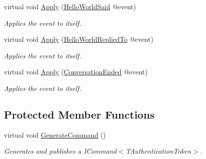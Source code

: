 \begin{DoxyCompactItemize}
virtual void \hyperlink{classCqrs_1_1Akka_1_1Tests_1_1Unit_1_1Sagas_1_1ConversationReportProcessManager_a19573bf2840357a4e79f310c3fdfe916_a19573bf2840357a4e79f310c3fdfe916}{Apply} (\hyperlink{classCqrs_1_1Akka_1_1Tests_1_1Unit_1_1Events_1_1HelloWorldSaid}{Hello\+World\+Said} @event)
\begin{DoxyCompactList}\small\item\em Applies the {\itshape event}  to itself. \end{DoxyCompactList}\item 
virtual void \hyperlink{classCqrs_1_1Akka_1_1Tests_1_1Unit_1_1Sagas_1_1ConversationReportProcessManager_a938040ac51a3deb02ae36adb7f5999fb_a938040ac51a3deb02ae36adb7f5999fb}{Apply} (\hyperlink{classCqrs_1_1Akka_1_1Tests_1_1Unit_1_1Events_1_1HelloWorldRepliedTo}{Hello\+World\+Replied\+To} @event)
\begin{DoxyCompactList}\small\item\em Applies the {\itshape event}  to itself. \end{DoxyCompactList}\item 
virtual void \hyperlink{classCqrs_1_1Akka_1_1Tests_1_1Unit_1_1Sagas_1_1ConversationReportProcessManager_ae2c1edeb1a4d604948b4c70b71c20555_ae2c1edeb1a4d604948b4c70b71c20555}{Apply} (\hyperlink{classCqrs_1_1Akka_1_1Tests_1_1Unit_1_1Events_1_1ConversationEnded}{Conversation\+Ended} @event)
\begin{DoxyCompactList}\small\item\em Applies the {\itshape event}  to itself. \end{DoxyCompactList}\end{DoxyCompactItemize}
\subsection*{Protected Member Functions}
\begin{DoxyCompactItemize}
\item 
virtual void \hyperlink{classCqrs_1_1Akka_1_1Tests_1_1Unit_1_1Sagas_1_1ConversationReportProcessManager_a0c10a4f4b6eae7a1c5b321a07b02a1d1_a0c10a4f4b6eae7a1c5b321a07b02a1d1}{Generate\+Command} ()
\begin{DoxyCompactList}\small\item\em Generates and publishes a I\+Command$<$\+T\+Authentication\+Token$>$. \end{DoxyCompactList}\end{DoxyCompactItemize}

